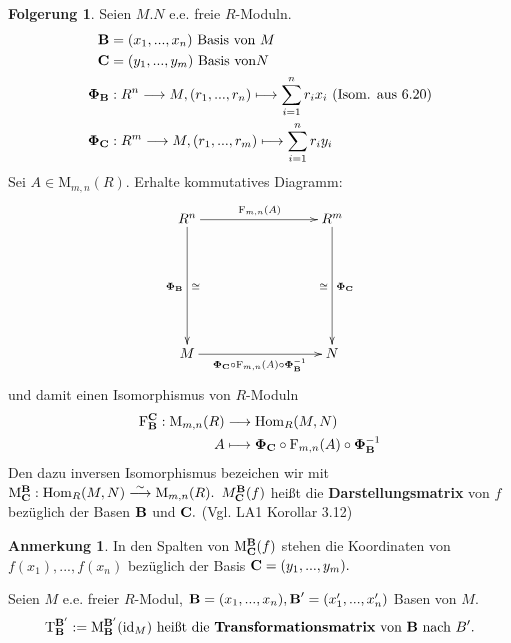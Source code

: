 \documentclass[a4paper, titlepage]{article}
\theoremstyle{definition}
\newtheorem*{anm}{Anmerkung}
\newtheorem*{fg}{Folgerung}
\newcommand{\M}{\mathrm{M}}
\newcommand{\Hom}{\mathrm{Hom}}
\newcommand{\F}{\mathrm{F}}
\newcommand{\B}{\text{\textbf{B}}}
\newcommand{\CB}{\text{\textbf{C}}}
\newcommand{\T}[2][1]{\mathrm{T}_{#2}^{#1}}
\newcommand{\MS}[2][1]{\mathrm{M}_{#2}^{#1}}
\newcommand{\id}{\mathrm{id}}
\begin{document}
        \begin{fg}
            Seien $M.N$ e.e. freie $R$-Moduln.
            \begin{align*}
                \B&=(x_1,...,x_n) \text{ Basis von }M\\
                \CB&=(y_1,...,y_m) \text{ Basis von}N\\
                \boldsymbol{\Phi}_{\B}&:R^n\longrightarrow M, (r_1,...,r_n)\longmapsto \sum\limits_{i=1}^{n}r_ix_i \text{ (Isom. aus 6.20)}\\
                \boldsymbol{\Phi}_{\CB}&:R^m\longrightarrow M, (r_1,...,r_m)\longmapsto \sum\limits_{i=1}^{n}r_iy_i 
            \end{align*}
            Sei $A\in \M_{m,n}(R).$ Erhalte kommutatives Diagramm:
            \[
                \begin{xy}
                    \xymatrix{
                       R^n \ar[rrr]^{\F_{m,n}(A)} \ar[ddd]_{\boldsymbol{\Phi}_{\B}}^{\cong} &&& R^m \ar[ddd]_{\cong}^{\boldsymbol{\Phi}_{\CB}}\\
                       &&&\\
                       &&&\\
                       M \ar[rrr]_{\boldsymbol{\Phi}_{\CB}\circ \F_{m,n}(A)\circ \boldsymbol{\Phi}_{\B}^{-1}} &&& N
                    }
        
                \end{xy}
            \] und damit einen Isomorphismus von $R$-Moduln
            \begin{align*}
                \F_{\B}^{\CB}:\M_{m,n}(R)&\longrightarrow \Hom_R(M,N)\\
                A&\longmapsto \boldsymbol{\Phi}_{\CB}\circ \F_{m,n}(A)\circ \boldsymbol{\Phi}_{\B}^{-1}
            \end{align*}
            Den dazu inversen Isomorphismus bezeichen wir mit $\M_{\CB}^{\B}: \Hom_R(M,N)\overset{\sim}{\longrightarrow}\M_{m,n}(R).$
            $M_{\CB}^{\B}(f)$ heißt die \textbf{Darstellungsmatrix} von $f$ bezüglich der Basen $\B$ und $\CB.$ (Vgl. LA1 Korollar 3.12)
        \end{fg}
        \begin{anm}
            In den Spalten von $\M_{\CB}^{\B}(f)$ stehen die Koordinaten von $f(x_1),...,f(x_n)$ bezüglich der Basis $\CB=(y_1,...,y_m).$
        \end{anm}
        \begin{definition}
            Seien $M$ e.e. freier $R$-Modul, $\B=(x_1,...,x_n),\B'=(x_1',...,x_n')$ Basen von $M.$
            $$\T[\B']{\B}:=\MS[\B']{\B}(\id_M)\text{ heißt die \textbf{Transformationsmatrix} von }\B \text{ nach }B'.$$
        \end{definition}
\end{document}
